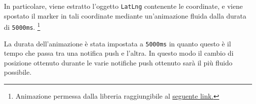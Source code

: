 In particolare, viene estratto l'oggetto \texttt{LatLng} contenente le coordinate, e viene spostato il marker in tali coordinate mediante un'animazione fluida dalla durata di \texttt{5000ms}. \footnote{Animazione permessa dalla libreria raggiungibile al \href{https://gist.github.com/jcholin/a0afa38e606f9722680cbc25c3cea46b}{seguente link.}}

La durata dell'animazione è stata impostata a \texttt{5000ms} in quanto questo è il tempo che passa tra una notifica push e l'altra. In questo modo il cambio di posizione ottenuto durante le varie notifiche push ottenuto sarà il più fluido possibile. 